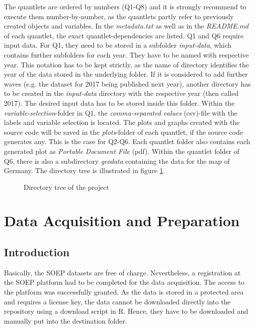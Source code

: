 \documentclass[a4paper]{article}
\begin{document}
The quantlets are ordered by numbers (Q1-Q8) and it is strongly recommend to execute them number-by-number, as the quantlets partly refer to previously created objects and variables. In the \textit{metadata.txt} as well as in the \textit{README.md} of each quantlet, the exact quantlet-dependencies are listed. Q1 and Q6 require input data. For Q1, they need to be stored in a subfolder \textit{input-data}, which contains further subfolders for each year. They have to be named with respective year.
This notation has to be kept strictly, as the name of directory identifies the year of the data stored in the underlying folder. If it is considered to add further waves (e.g. the dataset for 2017 being published next year), another directory has to be created in the \textit{input-data} directory with the respective year (then called 2017). The desired input data has to be stored inside this folder.
Within the \textit{variable-selection}-folder in Q1, the \textit{comma-separated values} (csv)-file with the labels and variable selection is located. The plots and graphs created with the source code will be saved in the \textit{plots}-folder of each quantlet, if the source code generates any. This is the case for Q2-Q6. Each quantlet folder also contains each generated plot as \textit{Portable Document File} (pdf). Within the quantlet folder of Q6, there is also a subdirectory \textit{geodata} containing the data for the map of Germany.
The directory tree is illustrated in figure \ref{figure:tree}.

\begin{figure}
  	\caption{Directory tree of the project} 
  	\label{figure:tree} 
\end{figure}



\section{Data Acquisition and Preparation}
\subsection{Introduction}
Basically, the SOEP datasets are free of charge. Nevertheless, a registration at the SOEP platform had to be completed for the data acquisition. The access to the platform was successfully granted. As the data is stored in a protected area and requires a license key, the data cannot be downloaded directly into the repository using a download script in R. Hence, they have to be downloaded and manually put into the destination folder.
\end{document}
